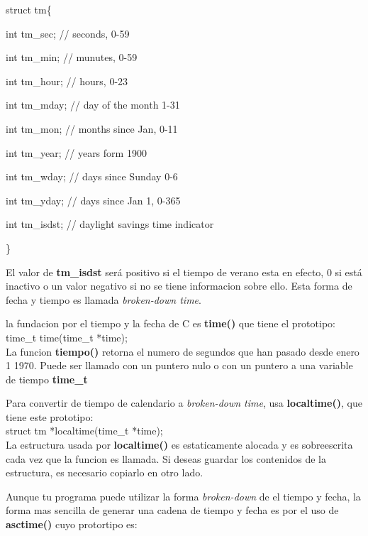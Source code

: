 \documentclass[]{article}
\begin{document}
				struct tm\{
				
				int tm\_sec; // seconds, 0-59
				
				int tm\_min; // munutes, 0-59
				
				int tm\_hour; // hours, 0-23
				
				int tm\_mday; // day of the month 1-31
				
				int tm\_mon; // months since Jan, 0-11
				
				int tm\_year; // years form 1900
				
				int tm\_wday; // days since Sunday 0-6
				
				int tm\_yday; // days since Jan 1, 0-365
				
				int tm\_isdst; // daylight savings time indicator
				
				\}
					
					
				El valor de \textbf{tm\_isdst}  será positivo si el tiempo de verano esta en efecto, 0 si está inactivo o un valor negativo si no se tiene informacion sobre ello. Esta forma de fecha y tiempo es llamada \textit{broken-down time}.
				
				la fundacion por el tiempo y la fecha de C es \textbf{time()} que tiene el prototipo:\\
				
				time\_t time(time\_t *time);\\
				
				La funcion \textbf{tiempo()} retorna el numero de segundos que han pasado desde enero 1 1970. Puede ser llamado con un puntero nulo o con un puntero a una variable de tiempo \textbf{time\_t}
				
				Para convertir de tiempo de calendario a \textit{broken-down time}, usa \textbf{localtime()}, que tiene este prototipo:\\
				
				struct tm *localtime(time\_t *time);\\
				
				La estructura usada por \textbf{localtime()} es estaticamente alocada y es sobreescrita cada vez que la funcion es llamada. Si deseas guardar los contenidos de la estructura, es necesario copiarlo en otro lado.
				
				Aunque tu programa puede utilizar la forma \textit{broken-down} de el tiempo y fecha, la forma mas sencilla de generar una cadena de tiempo y fecha es por el uso de \textbf{asctime()} cuyo protortipo es:\\
				
\end{document}
